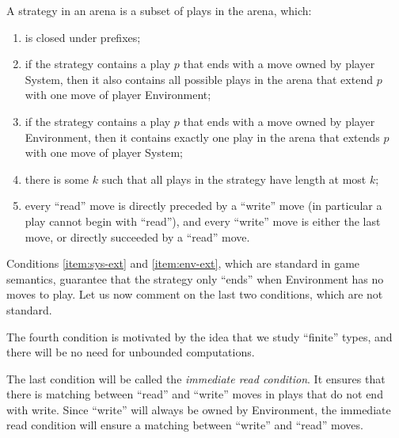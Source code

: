 \documentclass[10pt,a4paper]{amsart}
\numberwithin{equation}{section}
\theoremstyle{plain}
\begin{document}
\begin{definition}[Strategy]
    A strategy  in an arena  is a subset of plays in the arena, which: 
    \begin{enumerate}
        \item is closed under prefixes;
        \item\label{item:sys-ext} if the strategy contains a play $p$ that ends with a move owned by player System, then it also contains all possible plays  in the arena that extend $p$ with one move of player Environment;
        \item\label{item:env-ext} if the strategy contains a play $p$ that ends with a move owned by player Environment, then it contains exactly one play  in the arena that extends $p$ with one move of player System;
         \item there is some $k$ such that all plays in the strategy have length at most $k$;
        \item every ``read'' move is directly preceded by a ``write'' move (in particular a play cannot begin with ``read''), and every ``write'' move is either the last move, or directly succeeded by a ``read'' move.
    \end{enumerate}
\end{definition}

Conditions \ref{item:sys-ext} and \ref{item:env-ext}, which are standard in game semantics,  guarantee that the strategy only ``ends'' when 
Environment has no moves to play.  Let us now comment on the last two conditions, which are not standard.

The fourth condition is motivated by the idea that we study ``finite'' types,  and there will be no need for unbounded computations. 

The last condition will be called the  \emph{immediate read condition}. It ensures that there is matching between ``read'' and ``write'' moves in plays that do not end with write. Since ``write'' will always be owned by Environment, the immediate read condition will ensure a matching between ``write'' and ``read'' moves.
\end{document}
